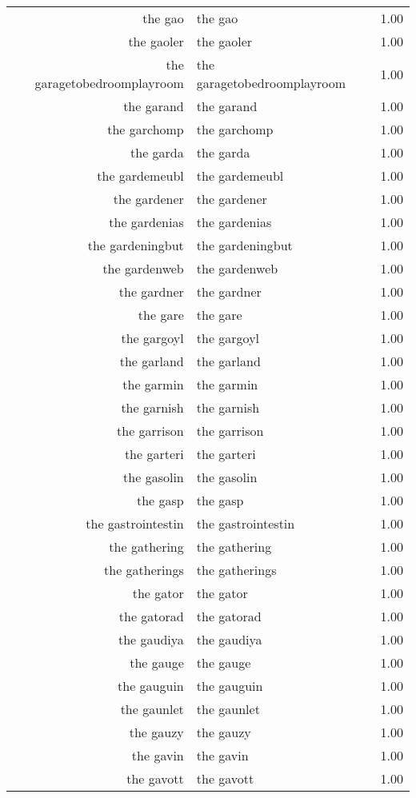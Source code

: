 \begin{table}[ht]
\begin{tabular}{rlr}
  the gao & the gao & 1.00 \\ 
  the gaoler & the gaoler & 1.00 \\ 
  the garagetobedroomplayroom & the garagetobedroomplayroom & 1.00 \\ 
  the garand & the garand & 1.00 \\ 
  the garchomp & the garchomp & 1.00 \\ 
  the garda & the garda & 1.00 \\ 
  the gardemeubl & the gardemeubl & 1.00 \\ 
  the gardener & the gardener & 1.00 \\ 
  the gardenias & the gardenias & 1.00 \\ 
  the gardeningbut & the gardeningbut & 1.00 \\ 
  the gardenweb & the gardenweb & 1.00 \\ 
  the gardner & the gardner & 1.00 \\ 
  the gare & the gare & 1.00 \\ 
  the gargoyl & the gargoyl & 1.00 \\ 
  the garland & the garland & 1.00 \\ 
  the garmin & the garmin & 1.00 \\ 
  the garnish & the garnish & 1.00 \\ 
  the garrison & the garrison & 1.00 \\ 
  the garteri & the garteri & 1.00 \\ 
  the gasolin & the gasolin & 1.00 \\ 
  the gasp & the gasp & 1.00 \\ 
  the gastrointestin & the gastrointestin & 1.00 \\ 
  the gathering & the gathering & 1.00 \\ 
  the gatherings & the gatherings & 1.00 \\ 
  the gator & the gator & 1.00 \\ 
  the gatorad & the gatorad & 1.00 \\ 
  the gaudiya & the gaudiya & 1.00 \\ 
  the gauge & the gauge & 1.00 \\ 
  the gauguin & the gauguin & 1.00 \\ 
  the gaunlet & the gaunlet & 1.00 \\ 
  the gauzy & the gauzy & 1.00 \\ 
  the gavin & the gavin & 1.00 \\ 
  the gavott & the gavott & 1.00 \\ 

\end{tabular}
\end{table}
